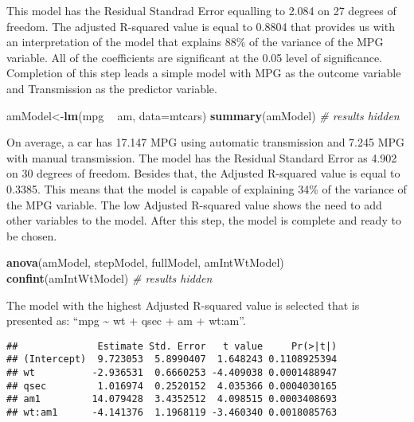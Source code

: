 \documentclass[]{article}
\newenvironment{Shaded}{\begin{snugshade}}{\end{snugshade}}
\newcommand{\KeywordTok}[1]{\textcolor[rgb]{0.13,0.29,0.53}{\textbf{#1}}}
\newcommand{\DataTypeTok}[1]{\textcolor[rgb]{0.13,0.29,0.53}{#1}}
\newcommand{\StringTok}[1]{\textcolor[rgb]{0.31,0.60,0.02}{#1}}
\newcommand{\CommentTok}[1]{\textcolor[rgb]{0.56,0.35,0.01}{\textit{#1}}}
\newcommand{\OperatorTok}[1]{\textcolor[rgb]{0.81,0.36,0.00}{\textbf{#1}}}
\newcommand{\NormalTok}[1]{#1}
\begin{document}
This model has the Residual Standrad Error equalling to 2.084 on 27
degrees of freedom. The adjusted R-squared value is equal to 0.8804 that
provides us with an interpretation of the model that explains 88\% of
the variance of the MPG variable. All of the coefficients are
significant at the 0.05 level of significance. Completion of this step
leads a simple model with MPG as the outcome variable and Transmission
as the predictor variable.

\begin{Shaded}
\begin{Highlighting}[]
\NormalTok{amModel<-}\KeywordTok{lm}\NormalTok{(mpg }\OperatorTok{~}\StringTok{ }\NormalTok{am, }\DataTypeTok{data=}\NormalTok{mtcars)}
\KeywordTok{summary}\NormalTok{(amModel) }\CommentTok{# results hidden}
\end{Highlighting}
\end{Shaded}

On average, a car has 17.147 MPG using automatic transmission and 7.245
MPG with manual transmission. The model has the Residual Standard Error
as 4.902 on 30 degrees of freedom. Besides that, the Adjusted R-squared
value is equal to 0.3385. This means that the model is capable of
explaining 34\% of the variance of the MPG variable. The low Adjusted
R-squared value shows the need to add other variables to the model.
After this step, the model is complete and ready to be chosen.

\begin{Shaded}
\begin{Highlighting}[]
\KeywordTok{anova}\NormalTok{(amModel, stepModel, fullModel, amIntWtModel) }
\KeywordTok{confint}\NormalTok{(amIntWtModel) }\CommentTok{# results hidden}
\end{Highlighting}
\end{Shaded}

The model with the highest Adjusted R-squared value is selected that is
presented as: ``mpg \textasciitilde{} wt + qsec + am + wt:am''.

\begin{Shaded}
\end{Shaded}

\begin{verbatim}
##              Estimate Std. Error   t value     Pr(>|t|)
## (Intercept)  9.723053  5.8990407  1.648243 0.1108925394
## wt          -2.936531  0.6660253 -4.409038 0.0001488947
## qsec         1.016974  0.2520152  4.035366 0.0004030165
## am1         14.079428  3.4352512  4.098515 0.0003408693
## wt:am1      -4.141376  1.1968119 -3.460340 0.0018085763
\end{verbatim}
\end{document}
